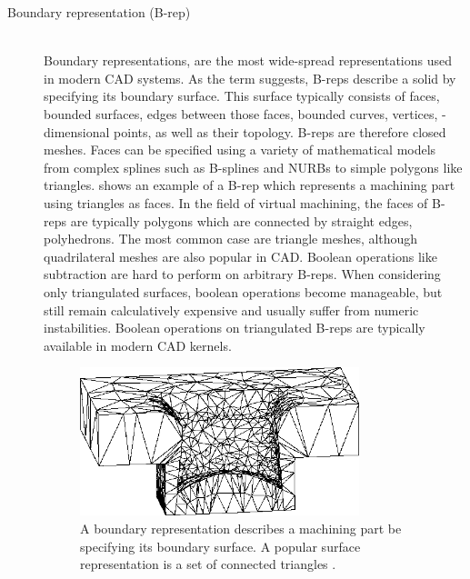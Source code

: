 \begin{description}
	\item[Boundary representation (B-rep)] \hfill \\
	Boundary representations, are the most wide-spread representations used in modern CAD systems.
	As the term suggests, B-reps describe a solid by specifying its boundary surface.
	This surface typically consists of faces, \ie bounded surfaces, edges between those faces, \ie bounded curves, vertices, -dimensional points, as well as their topology.
	B-reps are therefore closed meshes.
	Faces can be specified using a variety of mathematical models from complex splines such as B-splines and NURBs to simple polygons like triangles.
	 shows an example of a B-rep which represents a machining part using triangles as faces.
	In the field of virtual machining, the faces of B-reps are typically polygons which are connected by straight edges, \ie polyhedrons.
	The most common case are triangle meshes, although quadrilateral meshes are also popular in CAD.
	Boolean operations like subtraction are hard to perform on arbitrary B-reps.
	When considering only triangulated surfaces, boolean operations become manageable, but still remain calculatively expensive and usually suffer from numeric instabilities.
	Boolean operations on triangulated B-reps are typically available in modern CAD kernels.

	\begin{figure}[H]
		\centering
		\includegraphics[width=0.8\textwidth]{images/brep}
		\caption[B-rep]{
			A boundary representation describes a machining part be specifying its boundary surface. A popular surface representation is a set of connected triangles \cite{virtual_machining_review}.
		}
		\label{fig:brep}
	\end{figure}


\end{description}

